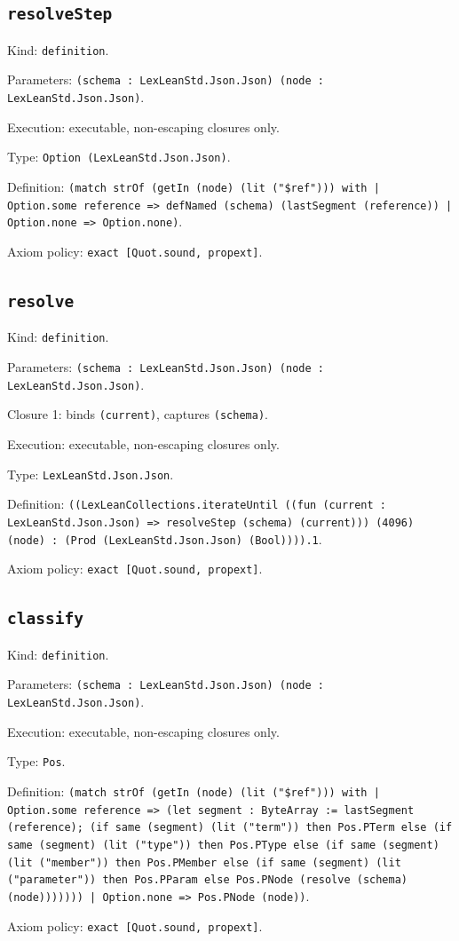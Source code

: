 \documentclass[11pt]{article}
\begin{document}
\subsection*{\texttt{resolveStep}}
\noindent Kind: \texttt{definition}.\par
\noindent Parameters: \texttt{(schema : LexLeanStd.Json.Json) (node : LexLeanStd.Json.Json)}.\par
\noindent Execution: executable, non-escaping closures only.\par
\noindent Type: \texttt{Option (LexLeanStd.Json.Json)}.\par
\noindent Definition: \texttt{(match strOf (getIn (node) (lit ("\$ref"))) with | Option.some reference => defNamed (schema) (lastSegment (reference)) | Option.none => Option.none)}.\par
\noindent Axiom policy: \texttt{exact [Quot.sound, propext]}.\par
\subsection*{\texttt{resolve}}
\noindent Kind: \texttt{definition}.\par
\noindent Parameters: \texttt{(schema : LexLeanStd.Json.Json) (node : LexLeanStd.Json.Json)}.\par
\noindent Closure 1: binds \texttt{(current)}, captures \texttt{(schema)}.\par
\noindent Execution: executable, non-escaping closures only.\par
\noindent Type: \texttt{LexLeanStd.Json.Json}.\par
\noindent Definition: \texttt{((LexLeanCollections.iterateUntil ((fun (current : LexLeanStd.Json.Json) => resolveStep (schema) (current))) (4096) (node) : (Prod (LexLeanStd.Json.Json) (Bool)))).1}.\par
\noindent Axiom policy: \texttt{exact [Quot.sound, propext]}.\par
\subsection*{\texttt{classify}}
\noindent Kind: \texttt{definition}.\par
\noindent Parameters: \texttt{(schema : LexLeanStd.Json.Json) (node : LexLeanStd.Json.Json)}.\par
\noindent Execution: executable, non-escaping closures only.\par
\noindent Type: \texttt{Pos}.\par
\noindent Definition: \texttt{(match strOf (getIn (node) (lit ("\$ref"))) with | Option.some reference => (let segment : ByteArray := lastSegment (reference); (if same (segment) (lit ("term")) then Pos.PTerm else (if same (segment) (lit ("type")) then Pos.PType else (if same (segment) (lit ("member")) then Pos.PMember else (if same (segment) (lit ("parameter")) then Pos.PParam else Pos.PNode (resolve (schema) (node))))))) | Option.none => Pos.PNode (node))}.\par
\noindent Axiom policy: \texttt{exact [Quot.sound, propext]}.\par
\end{document}
